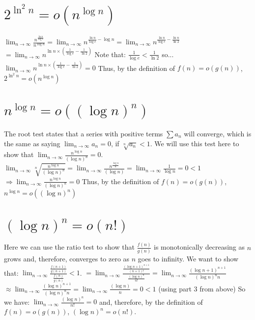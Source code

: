 \documentclass[12pt]{article}
\begin{document}
\section{$2^{\ln^2 n} = o(n^{\log n})$}
$\lim_{n\to\infty} \frac{n^{\frac{\ln n}{\log e}}}{n^{\log n}} = \lim_{n\to\infty} n^{\frac{\ln n}{\log e} - \log n} = \lim_{n\to\infty} n^{\frac{\ln n}{\log e} - \frac{\ln n}{\ln 2}}$
$= \lim_{n\to\infty} n^{\ln n \times (\frac{1}{\log e} - \frac{1}{\ln 2})}$
\newline
Note that: $\frac{1}{\log e} < \frac{1}{\ln 2}$  so...
\newline
$\lim_{n\to\infty} n^{\ln n \times (\frac{1}{\log e} - \frac{1}{\ln 2})} = 0$
\newline
Thus, by the definition of $f(n) = o(g(n))$, $2^{\ln^2 n} = o(n^{\log n})$
\section{$n^{\log n} = o((\log n)^n)$}
The root test states that a series with positive terms $\sum a_n$ will converge, which is the same as saying $\lim_{n\to\infty} a_n = 0$,
if $\sqrt[n]{a_n} < 1$. We will use this test here to show that $\lim_{n\to\infty} \frac{n^{\log n}}{(\log n)^n} = 0$.
\newline
\newline
$\lim_{n\to\infty} \sqrt[n]{\frac{n^{\log n}}{(\log n)^n}} = \lim_{n\to\infty} \frac{n^{\frac{\log n}{n}}}{(\log n)} = \lim_{n\to\infty} \frac{1}{\log n} = 0 < 1$
\newline
$\Rightarrow \lim_{n\to\infty} \frac{n^{\log n}}{(\log n)^n} = 0$
\newline
\newline
Thus, by the definition of $f(n) = o(g(n))$, $n^{\log n} = o((\log n)^n)$
\section{$(\log n)^n = o(n!)$}
Here we can use the ratio test to show that $\frac{f(n)}{g(n)}$ is monotonically decreasing as $n$ grows and, therefore, converges to zero as $n$ goes to infinity.
\newline
\newline
We want to show that: $\lim_{n\to\infty} \frac{\frac{f(n+1)}{g(n+1)}}{\frac{f(n)}{g(n)}} < 1$.
$= \lim_{n\to\infty} \frac{\frac{(\log n+1)^{n+1}}{(n+1)!}}{\frac{(\log n)^n}{n!}} = \lim_{n\to\infty} \frac{(\log n+1)^{n+1}}{(\log n)^n n}$
\newline
$\approx \lim_{n\to\infty} \frac{(\log n)^{n+1}}{(\log n)^n n} = \lim_{n\to\infty} \frac{(\log n)}{n} = 0 < 1$ (using part $3$ from above)
\newline
\newline
So we have:
\newline
$\lim_{n\to\infty} \frac{(\log n)^n}{n!} = 0$ and, therefore,
\newline
by the definition of $f(n) = o(g(n))$, $(\log n)^n = o(n!)$. 
\end{document}
